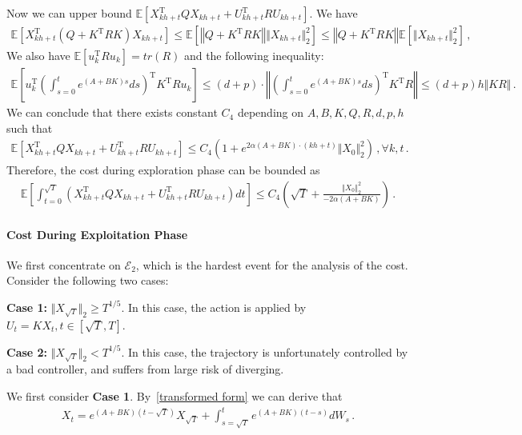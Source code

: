 \documentclass{article}
\theoremstyle{definition}
\begin{document}
Now we can upper bound $\mathbb{E}\left[X^{\mathrm{T}}_{kh+t}QX_{kh+t}+U^{\mathrm{T}}_{kh+t}RU_{kh+t}\right]$. 
We have
\begin{align*}
\mathbb{E}\left[X^{\mathrm{T}}_{kh+t}(Q+K^{\mathrm{T}}RK)X_{kh+t}\right]\leq \mathbb{E}\left[\left\Vert Q+K^{\mathrm{T}}RK\right\Vert \Vert X_{kh+t}\Vert^{2}_{2}\right]\leq \left\Vert Q+K^{\mathrm{T}}RK\right\Vert\mathbb{E}\left[\Vert X_{kh+t}\Vert^{2}_{2}\right]\,,
\end{align*}
We also have $\mathbb{E}\left[u^{\mathrm{T}}_{k}Ru_{k}\right]=tr(R)$ and the following inequality:
\begin{align*}
\mathbb{E}\left[u^{\mathrm{T}}_{k}\left(\int_{s=0}^{t}e^{(A+BK)s}ds\right)^{\mathrm{T}}K^{\mathrm{T}}Ru_{k}   \right]\leq (d+p)\cdot \left\Vert \left(\int_{s=0}^{t}e^{(A+BK)s}ds\right)^{\mathrm{T}}K^{\mathrm{T}}R \right\Vert\leq (d+p)h\Vert KR\Vert\,.
\end{align*}
We can conclude that there exists constant $C_{4}$ depending on $A,B,K,Q,R,d,p,h$ such that 
\begin{align*}
\mathbb{E}\left[X^{\mathrm{T}}_{kh+t}QX_{kh+t}+U^{\mathrm{T}}_{kh+t}RU_{kh+t}\right]\leq C_{4}\left(1+e^{2\alpha(A+BK)\cdot (kh+t)}\Vert X_{0}\Vert^{2}_{2}\right)\,, \forall k,t    \,.
\end{align*}
Therefore, the cost during exploration phase can be bounded as
\begin{align}\label{cost during exploration}
\mathbb{E}\left[\int_{t=0}^{\sqrt{T}}\left(X^{\mathrm{T}}_{kh+t}QX_{kh+t}+U^{\mathrm{T}}_{kh+t}RU_{kh+t}\right)dt\right]\leq C_{4}\left(\sqrt{T}+\frac{\Vert X_{0}\Vert^{2}_{2}}{-2\alpha(A+BK)}\right)\,.
\end{align}

\paragraph{Cost During Exploitation Phase}
We first concentrate on $\mathcal{E}_{2}$, which is the hardest event for the analysis of the cost. Consider the following two cases:

\textbf{Case 1:} $\Vert X_{\sqrt{T}}\Vert_{2}\geq T^{1/5}$. In this case, the action is applied by $U_{t}=KX_{t},t\in[\sqrt{T},T]$.

\textbf{Case 2:} $\Vert X_{\sqrt{T}}\Vert_{2}< T^{1/5}$. In this case, the trajectory is unfortunately controlled by a bad controller, and suffers from large risk of diverging.

We first consider \textbf{Case 1}. By~\eqref{transformed form} we can derive that
\begin{align*}
X_{t}=e^{(A+BK)(t-\sqrt{T})}X_{\sqrt{T}}+\int_{s=\sqrt{T}}^{t}e^{(A+BK)(t-s)}dW_{s}\,.
\end{align*}
\end{document}

